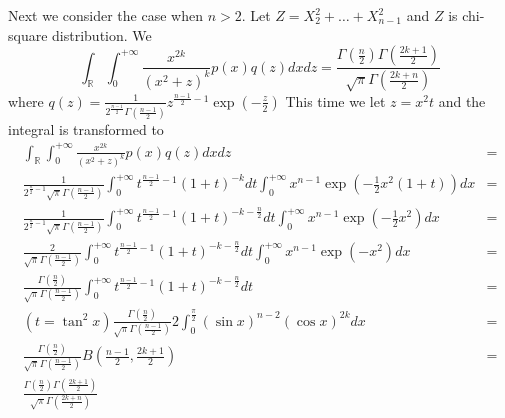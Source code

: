\documentclass{article}
\def\R{\mathbb{R}}
\begin{document}
Next we consider the case when $n>2$. Let $Z = X_2^2 + \dots + X_{n-1}^2$ and $Z$ is chi-square distribution. We 
\begin{equation}\label{eq:n3}
\int_{\R}\int_{0}^{+\infty} \frac{x^{2k}}{(x^2+z)^k} p(x)q(z)dxdz = \frac{\Gamma(\frac{n}{2}) \Gamma(\frac{2k+1}{2})}{\sqrt{\pi} \Gamma(\frac{2k+n}{2})}
\end{equation}
where $q(z) = \frac{1}{2^{\frac{n-1}{2}}\Gamma(\frac{n-1}{2})} z ^{\frac{n-1}{2} - 1} \exp(-\frac{z}{2})$
This time we let $z=x^2 t$ and the integral is transformed to 
\begin{align*}
\int_{\R}\int_{0}^{+\infty} \frac{x^{2k}}{(x^2+z)^k} p(x)q(z)dxdz & = \\
\frac{1}{2^{\frac{n}{2}-1}\sqrt{\pi}\Gamma(\frac{n-1}{2})} \int_{0}^{+\infty}t^{\frac{n-1}{2}-1}(1+t)^{-k}dt\int_{0}^{+\infty}x^{n-1} \exp(-\frac{1}{2}x^2(1+t)) dx &=
\\
\frac{1}{2^{\frac{n}{2}-1}\sqrt{\pi}\Gamma(\frac{n-1}{2})} \int_{0}^{+\infty}t^{\frac{n-1}{2}-1}(1+t)^{-k-\frac{n}{2}}dt\int_{0}^{+\infty}x^{n-1} \exp(-\frac{1}{2}x^2) dx &=
\\
\frac{2}{\sqrt{\pi}\Gamma(\frac{n-1}{2})} \int_{0}^{+\infty}t^{\frac{n-1}{2}-1}(1+t)^{-k-\frac{n}{2}}dt\int_{0}^{+\infty}x^{n-1} \exp(-x^2) dx &=
\\
\frac{\Gamma(\frac{n}{2})}{\sqrt{\pi}\Gamma(\frac{n-1}{2})} \int_{0}^{+\infty}t^{\frac{n-1}{2}-1}(1+t)^{-k-\frac{n}{2}}dt
&= \\ (t=\tan^2 x) \frac{\Gamma(\frac{n}{2})}{\sqrt{\pi}\Gamma(\frac{n-1}{2})} 2 \int_0^{\frac{\pi}{2}} (\sin x)^{n-2} (\cos x)^{2k} dx 
&= \\ \frac{\Gamma(\frac{n}{2})}{\sqrt{\pi}\Gamma(\frac{n-1}{2})} B(\frac{n-1}{2}, \frac{2k+1}{2})
&= \\ \frac{\Gamma(\frac{n}{2}) \Gamma(\frac{2k+1}{2})}{\sqrt{\pi} \Gamma(\frac{2k+n}{2})}
\end{align*}
\end{document}
